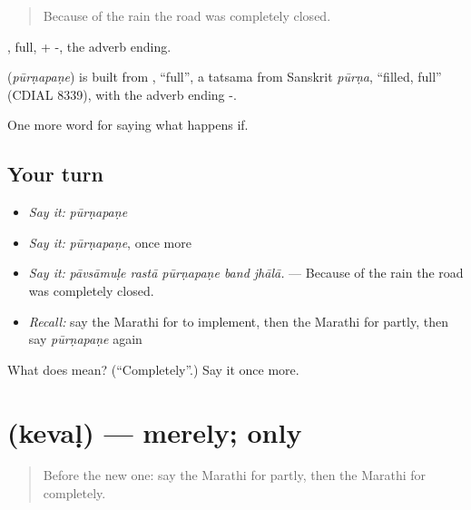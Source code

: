 \begin{quote}
Because of the rain the road was completely closed.
\end{quote}

, full, + -, the adverb ending.

\begin{cousinweb}
\textbf{} (\emph{pūrṇapaṇe}) is built from , \textquotedblleft{}full\textquotedblright{}, a tatsama from Sanskrit \emph{pūrṇa}, \textquotedblleft{}filled, full\textquotedblright{} (CDIAL 8339), with the adverb ending -.
\end{cousinweb}

\begin{grammarlens}[title={What you've built}]
One more word for saying what happens if.
\end{grammarlens}

\subsection*{Your turn}
\begin{itemize}
\raggedright
  \item \emph{Say it:} \emph{pūrṇapaṇe}
  \item \emph{Say it:} \emph{pūrṇapaṇe}, once more
  \item \emph{Say it:} \emph{pāvsāmuḷe rastā pūrṇapaṇe band jhālā.} — Because of the rain the road was completely closed.
  \item \emph{Recall:} say the Marathi for to implement, then the Marathi for partly, then say \emph{pūrṇapaṇe} again
\end{itemize}

\begin{tcolorbox}[breakable,colback=teal!4,colframe=teal!35!black,title={Before you move on}]
What does  mean? (\textquotedblleft{}Completely\textquotedblright{}.) Say it once more.
\end{tcolorbox}
\section[\texorpdfstring{\mr{केवळ} (kevaḷ)}{केवळ (kevaḷ)}]{ (kevaḷ) — merely; only}

\label{lesson:MR-C389-keval}



\begin{quote}
Before the new one: say the Marathi for partly, then the Marathi for completely.
\end{quote}

